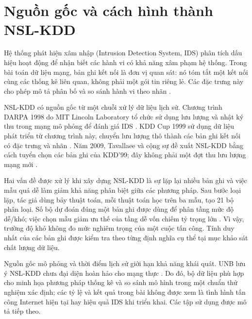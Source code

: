 \documentclass[../main.tex]{subfiles}
\begin{document}
\section{Nguồn gốc và cách hình thành NSL-KDD}
Hệ thống phát hiện xâm nhập (Intrusion Detection System, IDS) phân tích dấu hiệu hoạt động để nhận biết các hành vi có khả năng xâm phạm hệ thống. Trong bài toán dữ liệu mạng, bản ghi kết nối là đơn vị quan sát: nó tóm tắt một kết nối cùng các thống kê liên quan, không phải một gói tin riêng lẻ. Các đặc trưng này cho phép mô tả phân bố và so sánh hành vi theo nhãn \cite{task2_kdd1999}.

NSL-KDD có nguồn gốc từ một chuỗi xử lý dữ liệu lịch sử. Chương trình DARPA 1998 do MIT Lincoln Laboratory tổ chức sử dụng lưu lượng và nhật ký thu trong mạng mô phỏng để đánh giá IDS \cite{task1_mit1998}. KDD Cup 1999 sử dụng dữ liệu phát triển từ chương trình này, chuyển lưu lượng thô thành các bản ghi kết nối có đặc trưng và nhãn \cite{task2_kdd1999}. Năm 2009, Tavallaee và cộng sự đề xuất NSL-KDD bằng cách tuyển chọn các bản ghi của KDD'99; đây không phải một đợt thu lưu lượng mạng mới \cite{task1_tavallaee2009}.

Hai vấn đề được xử lý khi xây dựng NSL-KDD là sự lặp lại nhiều bản ghi và việc mẫu quá dễ làm giảm khả năng phân biệt giữa các phương pháp. Sau bước loại lặp, tác giả dùng bảy thuật toán, mỗi thuật toán học trên ba mẫu, tạo 21 bộ phân loại. Số bộ dự đoán đúng một bản ghi được dùng để phân tầng mức độ dễ/khó; việc chọn mẫu giảm ưu thế của tầng dễ vốn chiếm tỷ trọng lớn \cite{task1_tavallaee2009}. Vì vậy, trường độ khó không đo mức nghiêm trọng của một cuộc tấn công. Tính duy nhất của các bản ghi được kiểm tra theo từng định nghĩa cụ thể tại mục khảo sát chất lượng dữ liệu.

Nguồn gốc mô phỏng và thời điểm lịch sử giới hạn khả năng khái quát. UNB lưu ý NSL-KDD chưa đại diện hoàn hảo cho mạng thực \cite{task2_unb2009}. Do đó, bộ dữ liệu phù hợp cho minh họa phương pháp thống kê và so sánh mô hình trong một chuẩn thử nghiệm xác định; các tỷ lệ và kết quả trong bài không được xem là tình hình tấn công Internet hiện tại hay hiệu quả IDS khi triển khai. Các tập sử dụng được mô tả tiếp theo.
\end{document}
